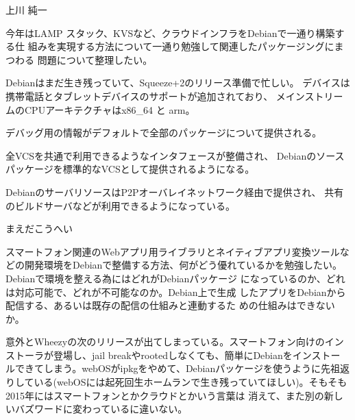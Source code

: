 
\begin{prework}{上川 純一}


今年はLAMP スタック、KVSなど、クラウドインフラをDebianで一通り構築する仕
組みを実現する方法について一通り勉強して関連したパッケージングにまつわる
問題について整理したい。

 
Debianはまだ生き残っていて、Squeeze+2のリリース準備で忙しい。
デバイスは携帯電話とタブレットデバイスのサポートが追加されており、
メインストリームのCPUアーキテクチャはx86\_64 と arm。

デバッグ用の情報がデフォルトで全部のパッケージについて提供される。

全VCSを共通で利用できるようなインタフェースが整備され、
Debianのソースパッケージを標準的なVCSとして提供されるようになる。

DebianのサーバリソースはP2Pオーバレイネットワーク経由で提供され、
共有のビルドサーバなどが利用できるようになっている。

\end{prework}

\begin{prework}{まえだこうへい}


 スマートフォン関連のWebアプリ用ライブラリとネイティブアプリ変換ツールな
 どの開発環境をDebianで整備する方法、何がどう優れているかを勉強したい。
 Debianで環境を整える為にはどれがDebianパッケージ
 になっているのか、どれは対応可能で、どれが不可能なのか。Debian上で生成
 したアプリをDebianから配信する、あるいは既存の配信の仕組みと連動するた
 めの仕組みはできないか。


 意外とWheezyの次のリリースが出てしまっている。スマートフォン向けのイン
 ストーラが登場し、jail breakやrootedしなくても、簡単にDebianをインストー
 ルできてしまう。webOSがipkgをやめて、Debianパッケージを使うように先祖返
 りしている(webOSには起死回生ホームランで生き残っていてほしい)。そもそも
 2015年にはスマートフォンとかクラウドとかいう言葉は 消えて、また別の新し
 いバズワードに変わっているに違いない。

\end{prework}


